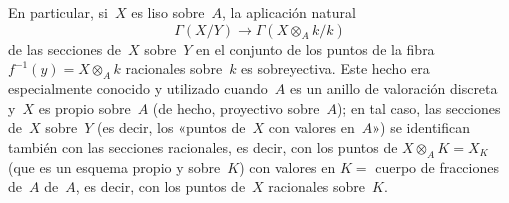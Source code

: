 En particular, si~$X$ es liso sobre~$A$, la aplicación natural
$$
\Gamma(X/Y)\to\Gamma(X\otimes_A k/k)
$$
de las secciones de~$X$ sobre~$Y$ en el conjunto de los puntos de la fibra $f^{-1}(y)=X\otimes_A k$ racionales sobre~$k$ es sobreyectiva. Este hecho era especialmente conocido y utilizado cuando~$A$ es un anillo de valoración discreta y~$X$
es propio sobre~$A$ (de hecho, proyectivo sobre~$A$); en tal caso, las secciones de~$X$ sobre~$Y$ (es decir, los «puntos de~$X$ con valores en~$A$») se identifican también con las secciones racionales, es decir, con los puntos de $X\otimes_A K=X_K$ (que es un esquema propio y
sobre~$K$) con valores en $K=$ cuerpo de fracciones
{de~$A$}
{de~$A$,}
es decir, con los puntos de~$X$ racionales sobre~$K$.
